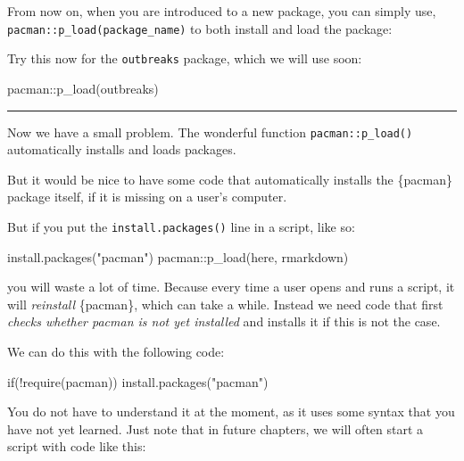 \documentclass[
  letterpaper,
  DIV=11,
  numbers=noendperiod]{scrreprt}
\newenvironment{Shaded}{\begin{snugshade}}{\end{snugshade}}
\newcommand{\ControlFlowTok}[1]{\textcolor[rgb]{0.00,0.23,0.31}{#1}}
\newcommand{\FunctionTok}[1]{\textcolor[rgb]{0.28,0.35,0.67}{#1}}
\newcommand{\NormalTok}[1]{\textcolor[rgb]{0.00,0.23,0.31}{#1}}
\newcommand{\SpecialCharTok}[1]{\textcolor[rgb]{0.37,0.37,0.37}{#1}}
\newcommand{\StringTok}[1]{\textcolor[rgb]{0.13,0.47,0.30}{#1}}
\begin{document}
From now on, when you are introduced to a new package, you can simply
use, \texttt{pacman::p\_load(package\_name)} to both install and load
the package:

Try this now for the \texttt{outbreaks} package, which we will use soon:

\begin{Shaded}
\begin{Highlighting}[]
\NormalTok{pacman}\SpecialCharTok{::}\FunctionTok{p\_load}\NormalTok{(outbreaks)}
\end{Highlighting}
\end{Shaded}

\begin{center}\rule{0.5\linewidth}{0.5pt}\end{center}

Now we have a small problem. The wonderful function
\texttt{pacman::p\_load()} automatically installs and loads packages.

But it would be nice to have some code that automatically installs the
\{pacman\} package itself, if it is missing on a user's computer.

But if you put the \texttt{install.packages()} line in a script, like
so:

\begin{Shaded}
\begin{Highlighting}[]
\FunctionTok{install.packages}\NormalTok{(}\StringTok{"pacman"}\NormalTok{)}
\NormalTok{pacman}\SpecialCharTok{::}\FunctionTok{p\_load}\NormalTok{(here, rmarkdown)}
\end{Highlighting}
\end{Shaded}

you will waste a lot of time. Because every time a user opens and runs a
script, it will \emph{reinstall} \{pacman\}, which can take a while.
Instead we need code that first \emph{checks whether pacman is not yet
installed} and installs it if this is not the case.

We can do this with the following code:

\begin{Shaded}
\begin{Highlighting}[]
\ControlFlowTok{if}\NormalTok{(}\SpecialCharTok{!}\FunctionTok{require}\NormalTok{(pacman)) }\FunctionTok{install.packages}\NormalTok{(}\StringTok{"pacman"}\NormalTok{)}
\end{Highlighting}
\end{Shaded}

You do not have to understand it at the moment, as it uses some syntax
that you have not yet learned. Just note that in future chapters, we
will often start a script with code like this:
\end{document}
